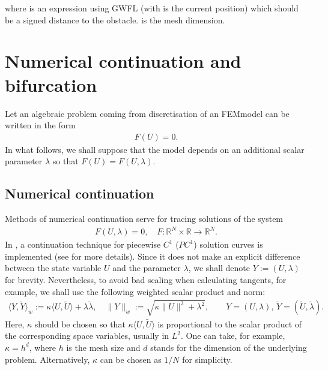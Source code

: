 \documentclass[a4paper,11pt,english]{sphinxmanual}
\begin{document}
where  is an expression using GWFL (with  is the current position) which should be a signed distance to the obstacle.  is the mesh dimension.

\ignorespaces 

\chapter{Numerical continuation and bifurcation}
\label{\detokenize{userdoc/model_continuation:numerical-continuation-and-bifurcation}}\label{\detokenize{userdoc/model_continuation:ud-model-continuation}}\label{\detokenize{userdoc/model_continuation:index-0}}\label{\detokenize{userdoc/model_continuation::doc}}
Let an algebraic problem coming from discretisation of an FEM\sphinxhyphen{}model can be
written in the form
\begin{equation*}
\begin{split}F(U) = 0.\end{split}
\end{equation*}
In what follows, we shall suppose that the model depends on an additional scalar
parameter \(\lambda\) so that \(F(U) = F(U, \lambda)\).


\section{Numerical continuation}
\label{\detokenize{userdoc/model_continuation:numerical-continuation}}
Methods of numerical continuation serve for tracing solutions of the system
\begin{equation*}
\begin{split}F(U, \lambda) = 0, \quad F\colon \mathbb{R}^{N} \times \mathbb{R} \to \mathbb{R}^{N}.\end{split}
\end{equation*}
In , a continuation technique for piecewise \(C^{1}\) (\(PC^{1}\))
solution curves is implemented (see  for more details). Since it
does not make an explicit difference between the state variable \(U\) and
the parameter \(\lambda\), we shall denote \(Y := (U, \lambda)\) for
brevity. Nevertheless, to avoid bad scaling when calculating tangents, for
example, we shall use the following weighted scalar product and norm:
\begin{equation*}
\begin{split}\langle Y, \tilde{Y} \rangle_{w} := \kappa \langle U, \tilde{U} \rangle + \lambda \tilde{\lambda},\quad \lVert Y \rVert_{w} := \sqrt{\kappa \lVert U \rVert^{2} + \lambda^{2}},\qquad Y = (U, \lambda),\, \tilde{Y} = (\tilde{U}, \tilde{\lambda}).\end{split}
\end{equation*}
Here, \(\kappa\) should be chosen so that
\(\kappa \langle U, \tilde{U} \rangle\) is proportional to the scalar
product of the corresponding space variables, usually in \(L^{2}\). One can
take, for example, \(\kappa = h^{d}\), where \(h\) is the mesh size and
\(d\) stands for the dimension of the underlying problem. Alternatively,
\(\kappa\) can be chosen as \(1/N\) for simplicity.
\end{document}

